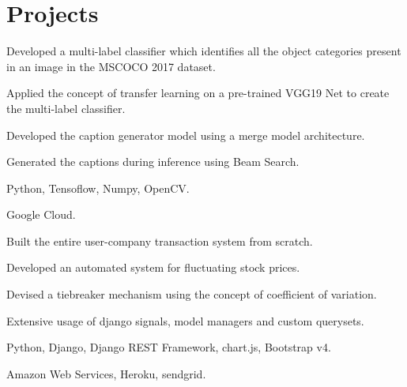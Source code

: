 
\section{Projects}

\begin{tightemize}
\item Developed a multi-label classifier which identifies all the object categories present in an image in the MSCOCO 2017 dataset.
\item Applied the concept of transfer learning on a pre-trained VGG19 Net to create the multi-label classifier.
\item Developed the caption generator model using a merge model architecture.
\item Generated the captions during inference using Beam Search.
\item {} Python, Tensoflow, Numpy, OpenCV.
\item {} Google Cloud.
\end{tightemize}
\sectionsep

\begin{tightemize}
\item Built the entire user-company transaction system from scratch.
\item Developed an automated system for fluctuating stock prices.
\item Devised a tiebreaker mechanism using the concept of coefficient of variation.
\item Extensive usage of django signals, model managers and custom querysets.
\item {} Python, Django, Django REST Framework, chart.js, Bootstrap v4.
\item {} Amazon Web Services, Heroku, sendgrid.
\end{tightemize}
\sectionsep

